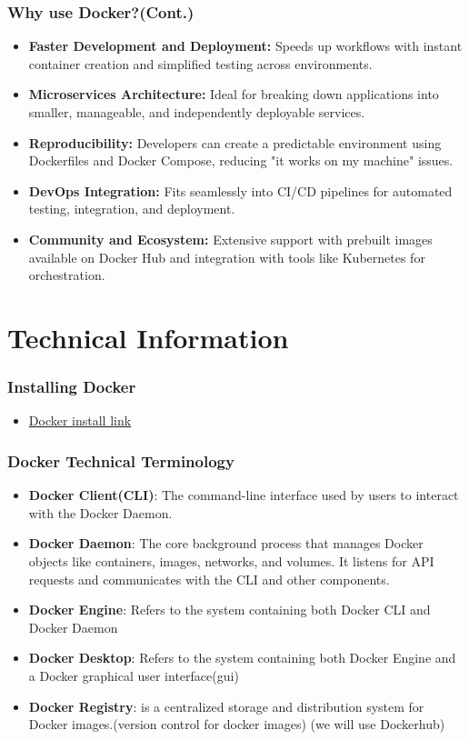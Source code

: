 \documentclass{beamer}
\begin{document}
\begin{frame}\frametitle{Why use Docker?(Cont.)}
\begin{itemize}
\item \textbf{Faster Development and Deployment:} Speeds up workflows with instant container creation and simplified testing across environments.
\item \textbf{Microservices Architecture:} Ideal for breaking down applications into smaller, manageable, and independently deployable services.
\item \textbf{Reproducibility:} Developers can create a predictable environment using Dockerfiles and Docker Compose, reducing "it works on my machine" issues.
\item \textbf{DevOps Integration:} Fits seamlessly into CI/CD pipelines for automated testing, integration, and deployment.
\item \textbf{Community and Ecosystem:} Extensive support with prebuilt images available on Docker Hub and integration with tools like Kubernetes for orchestration.
\end{itemize}
\end{frame}


\section{Technical Information}
\begin{frame}\frametitle{Installing Docker}
\begin{itemize}
\item \href{https://docs.docker.com/get-started/get-docker/}{Docker install link}   
\end{itemize}
\end{frame}


\begin{frame}\frametitle{Docker Technical Terminology}
\begin{itemize}
\item \textbf{Docker Client(CLI)}: The command-line interface used by users
to interact with the Docker Daemon.
\item \textbf{Docker Daemon}: The core background process that manages Docker
objects like containers, images, networks, and volumes. It listens for API
requests and communicates with the CLI and other components.
\item \textbf{Docker Engine}: Refers to the system containing both Docker CLI and Docker Daemon
\item \textbf{Docker Desktop}: Refers to the system containing both Docker Engine and a Docker graphical user interface(gui)
\item \textbf{Docker Registry}: is a centralized storage and distribution system for Docker images.(version control for docker images) (we will use Dockerhub)
\end{itemize}
\end{frame}
\end{document}
